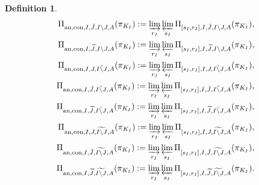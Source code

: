 \documentclass[12pt]{amsart}
\theoremstyle{definition}
\newtheorem{definition}[theorem]{Definition}
\numberwithin{equation}{section}
\begin{document}
\begin{definition}
\begin{align}
\Pi_{\mathrm{an},\mathrm{con},I,\breve{J},I\backslash J,A}(\pi_{K_I}):=\varinjlim_{r_I}\varprojlim_{s_I}\Pi_{[s_I,r_I],I,\breve{J},I\backslash J,A}(\pi_{K_I}),\\	
\Pi_{\mathrm{an},\mathrm{con},I,\widetilde{J},I\backslash J,A}(\pi_{K_I}):=\varinjlim_{r_I}\varprojlim_{s_I} \Pi_{[s_I,r_I],I,\widetilde{J},I\backslash J,A}(\pi_{K_I}),\\
\Pi_{\mathrm{an},\mathrm{con},I,J,\breve{I\backslash J},A}(\pi_{K_I}):=\varinjlim_{r_I}\varprojlim_{s_I}\Pi_{[s_I,r_I],I,J,\breve{I\backslash J},A}(\pi_{K_I}),\\	
\Pi_{\mathrm{an},\mathrm{con},I,\breve{J},\breve{I\backslash J},A}(\pi_{K_I}):=\varinjlim_{r_I}\varprojlim_{s_I} \Pi_{[s_I,r_I],I,\breve{J},\breve{I\backslash J},A}(\pi_{K_I}),\\
\Pi_{\mathrm{an},\mathrm{con},I,\widetilde{J},\breve{I\backslash J},A}(\pi_{K_I}):=\varinjlim_{r_I}\varprojlim_{s_I} \Pi_{[s_I,r_I],I,\widetilde{J},\breve{I\backslash J},A}(\pi_{K_I}),\\
\Pi_{\mathrm{an},\mathrm{con},I,J,\widetilde{I\backslash J},A}(\pi_{K_I}):=\varinjlim_{r_I}\varprojlim_{s_I} \Pi_{[s_I,r_I],I,J,\widetilde{I\backslash J},A}(\pi_{K_I}),\\	
\Pi_{\mathrm{an},\mathrm{con},I,\breve{J},\widetilde{I\backslash J},A}(\pi_{K_I}):=\varinjlim_{r_I}\varprojlim_{s_I} \Pi_{[s_I,r_I],I,\breve{J},\widetilde{I\backslash J},A}(\pi_{K_I}),\\	
\Pi_{\mathrm{an},\mathrm{con},I,\widetilde{J},\widetilde{I\backslash J},A}(\pi_{K_I}):=\varinjlim_{r_I}\varprojlim_{s_I} \Pi_{[s_I,r_I],I,\widetilde{J},\widetilde{I\backslash J},A}(\pi_{K_I}).\\	
\end{align}	
\end{definition}
\end{document}
